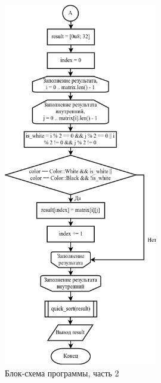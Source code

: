 \documentclass[14pt, a4paper]{extreport}
\begin{document}
\begin{figure}[H]
	\caption{Блок-схема программы, часть 2}
	\label{fig:scheme-main-part2}
	\includegraphics[width=0.6\textwidth]{scheme-main-part2}
\end{figure}
\end{document}
